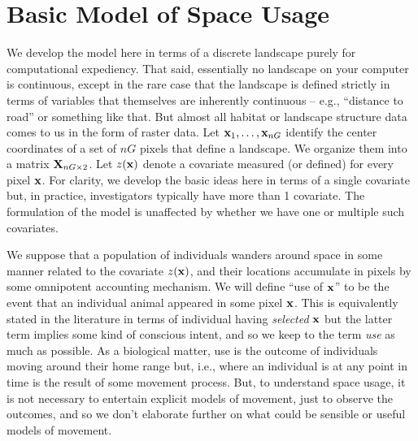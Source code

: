 \section{Basic Model of Space Usage}
\label{rsf.sec.rsfmodel}

We develop the model here in terms of a discrete landscape purely for
computational expediency. That said, essentially no landscape on your
computer is continuous, except in the rare case that the landscape is
defined strictly in terms of variables that themselves are inherently
continuous -- e.g., ``distance to road'' or something like that.  But
almost all habitat or landscape structure data comes to us in the form
of raster data.  Let ${\bf x}_{1},\ldots,{\bf x}_{nG}$ identify the center
coordinates of a set of $nG$ pixels that define a landscape.
We organize them into a matrix
${\bf X}_{nG \times 2}$.  Let $z({\bf x})$ denote a covariate measured
(or defined) for
every pixel ${\bf x}$. For clarity, we develop the basic ideas here in terms of a
single covariate but, in practice, investigators typically have more
than 1 covariate. The formulation of the model is unaffected by
whether we have one or multiple such covariates.

We suppose that a population of individuals wanders around space in
some manner related to the covariate $z({\bf x})$, and their locations
accumulate in pixels by some omnipotent accounting mechanism. We will
define ``use of ${\bf x}$'' to be the event that an individual animal
appeared in some pixel ${\bf x}$. This is equivalently stated in the
literature in terms of individual having {\it selected} ${\bf x}$ but
the latter term implies some kind of 
conscious intent, and so we keep to the term {\it use} as much as
possible.
As a biological matter, use is the outcome of
individuals moving around their home range but, i.e., where an
individual is at any point in time is the result of some movement
process. But, to understand space usage, it is not necessary to
entertain explicit models of movement, just to observe the outcomes,
and so we don't elaborate further on what could be sensible or useful
models of movement.

